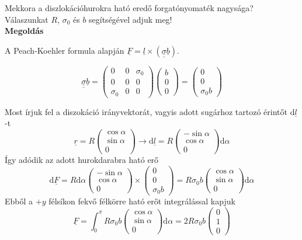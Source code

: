 \documentclass[12pt]{article}
\begin{document}
Mekkora a diszlokációhurokra ható eredő forgatónyomaték nagysága? Válaszunkat $R$, $\sigma_0$ és $b$ segítségével adjuk meg!
\\

\textbf{Megoldás}

A Peach-Koehler formula alapján $\underline{F}=\underline{l}\times(\underline{\underline{\sigma}}\underline{b})$.

$$ \underline{\underline{\sigma}}\underline{b}= 
\begin{pmatrix} 0 & 0 & \sigma_0\\ 0 & 0 & 0 \\ \sigma_0 & 0 & 0 \end{pmatrix} \begin{pmatrix} b \\ 0\\ 0\end{pmatrix} = \begin{pmatrix} 0 \\ 0\\  \sigma_0 b \end{pmatrix}$$

Most írjuk fel a diszokáció irányvektorát, vagyis adott sugárhoz tartozó érintőt $\mathrm{d}\underline{l}$-t
$$ \underline{r} = R\begin{pmatrix} \cos \alpha \\ \sin \alpha \\  0 \end{pmatrix} \longrightarrow \mathrm{d}\underline{l} = R\begin{pmatrix} -\sin \alpha \\ \cos \alpha \\  0 \end{pmatrix}\mathrm{d}\alpha$$ 
Így adódik az adott hurokdarabra ható erő
$$\mathrm{d}\underline{F}=R\mathrm{d}\alpha \begin{pmatrix} -\sin \alpha \\ \cos \alpha \\  0 \end{pmatrix} \times \begin{pmatrix} 0 \\ 0\\  \sigma_0 b \end{pmatrix}=R \sigma_0 b \begin{pmatrix} \cos \alpha \\ \sin \alpha \\  0 \end{pmatrix}\mathrm{d}\alpha$$
Ebből a $+y$ félsíkon fekvő félkörre ható erőt integrálással kapjuk
$$\underline{F} = \int_{0}^{\pi} R \sigma_0 b \begin{pmatrix} \cos \alpha \\ \sin \alpha \\  0 \end{pmatrix}\mathrm{d}\alpha = 2 R \sigma_0 b \begin{pmatrix} 0 \\ 1 \\  0 \end{pmatrix}$$ 
\end{document}
